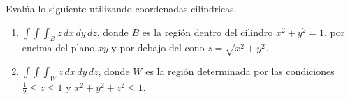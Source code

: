 Evalúa lo siguiente utilizando coordenadas cilíndricas.\\
	\begin{enumerate}
	\begin{enumerate}
		\item  \( \int \int \int_B z \, dx \, dy \, dz \), donde \( B \) es la región dentro del cilindro \( x^2 + y^2 = 1 \), por encima del plano \( xy \) y por debajo del cono \( z = \sqrt{x^2 + y^2} \).
		\item \( \int \int \int_W z \, dx \, dy \, dz \), donde \( W \) es la región determinada por las condiciones  \( \frac{1}{2} \leq z \leq 1 \) y \( x^2 + y^2 + z^2 \leq 1 \).
	\end{enumerate}
	\end{enumerate}
